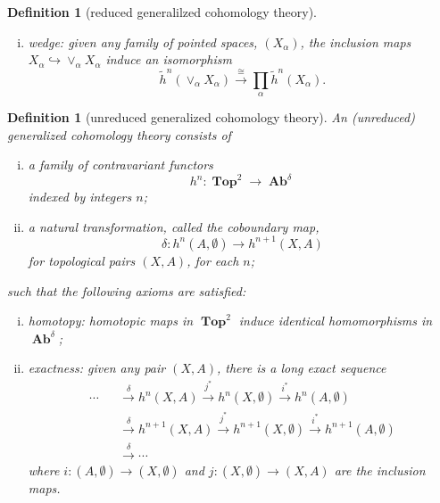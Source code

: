 \documentclass[sort&compress]{elsarticle}
\theoremstyle{theoremstyle}
\theoremstyle{framedtheoremstyle}
\theoremstyle{definitionstyle}
\newtheorem{dfn}[nul]{Definition}%
\theoremstyle{definitionstyle}
\theoremstyle{definitionstyle}
\theoremstyle{definitionstyle}
\theoremstyle{nameddefinitionstyle}
\theoremstyle{framednameddefinitionstyle}
\theoremstyle{proofstyle}
\theoremstyle{definitionstyle}
\newcommand{\fromto}{\rightarrow}
\newcommand{\oneone}{\hookrightarrow}
\newcommand{\xfromto}[1]{\xrightarrow{#1}}
\newcommand{\Top}{\operatorname{\mathbf{Top}}}
\newcommand{\Ab}{\operatorname{\mathbf{Ab}}}
\newcommand{\isomorphic}{\cong}
\newcommand{\paren}[1]{\left( #1 \right)}
\begin{document}
\begin{appendices}
\begin{dfn}[reduced generalilzed cohomology theory]
\begin{enumerate}[(i)]
\item wedge: given any family of pointed spaces, $\paren{X_\alpha}$, the inclusion maps $X_\alpha \oneone \vee_\alpha X_\alpha$ induce an isomorphism
\begin{equation}
\tilde h^n\paren{ \vee_\alpha X_\alpha } \xfromto{\isomorphic} \prod_\alpha \tilde h^n\paren{X_\alpha}.
\end{equation}
\end{enumerate}
\end{dfn}


\begin{dfn}[unreduced generalized cohomology theory]
\label{dfn:unreduced_generalized_cohomology_theory_2}
An (unreduced) generalized cohomology theory consists of
\begin{enumerate}[(i)]
\item a family of contravariant functors
\begin{equation}
h^n: \Top^2 \fromto \Ab^\delta
\end{equation}
indexed by integers $n$;

\item a natural transformation, called the coboundary map,
\begin{equation}
\delta: h^n\paren{A,\emptyset} \fromto h^{n+1}\paren{X,A}
\end{equation}
for topological pairs $(X,A)$, for each $n$;
\end{enumerate}
such that the following axioms are satisfied:
\begin{enumerate}[(i)]
\item homotopy: homotopic maps in $\Top^2$ induce identical homomorphisms in $\Ab^\delta$;

\item exactness: given any pair $(X,A)$, there is a long exact sequence
\begin{eqnarray}
\cdots && \xfromto{\delta} h^n\paren{X,A} \xfromto{j^*} h^n\paren{X,\emptyset} \xfromto{i^*} h^n\paren{A,\emptyset} \nonumber\\
&& \xfromto{\delta} h^{n+1}\paren{X,A} \xfromto{j^*} h^{n+1}\paren{X,\emptyset} \xfromto{i^*} h^{n+1}\paren{A,\emptyset} \nonumber\\
&& \xfromto{\delta} \cdots \label{LES_reduced}
\end{eqnarray}
where $i: \paren{A,\emptyset} \fromto \paren{X,\emptyset}$ and $j: \paren{X,\emptyset} \fromto \paren{X,A}$ are the inclusion maps.


\end{enumerate}
\end{dfn}
\end{appendices}
\end{document}

